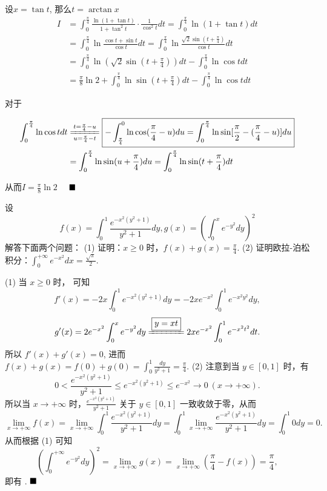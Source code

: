 \documentclass[lang=cn,newtx,10pt,scheme=chinese]{elegantbook}
\begin{document}
\begin{solution}
设$x=\tan t$, 那么$t=\arctan x$
\begin{align*}
I &= \int_{0}^{\frac{\pi}{4}}\frac{\ln(1+\tan t)}{1+\tan^2 t}\cdot\frac{1}{\cos^2 t}dt = \int_{0}^{\frac{\pi}{4}}\ln(1+\tan t)dt \\
&= \int_{0}^{\frac{\pi}{4}}\ln\frac{\cos t+\sin t}{\cos t}dt = \int_{0}^{\frac{\pi}{4}}\ln\frac{\sqrt{2}\sin(t+\frac{\pi}{4})}{\cos t}dt \\
&= \int_{0}^{\frac{\pi}{4}}\ln(\sqrt{2}\sin(t+\frac{\pi}{4}))dt - \int_{0}^{\frac{\pi}{4}}\ln\cos t dt \\
&= \frac{\pi}{8}\ln 2 + \int_{0}^{\frac{\pi}{4}}\ln\sin(t+\frac{\pi}{4})dt - \int_{0}^{\frac{\pi}{4}}\ln\cos t dt
\end{align*}

对于



\begin{align*}
    \int_{0}^{\frac{\pi}{4}}\ln\cos t dt &\xlongequal[u=\frac{\pi}{4}-t]{t=\frac{\pi}{4}-u} \boxed{-\int_{\frac{\pi}{4}}^{0}\ln\cos(\frac{\pi}{4}-u)du = \int_{0}^{\frac{\pi}{4}}\ln\sin[\frac{\pi}{2}-(\frac{\pi}{4}-u)]du}\\
&= \int_{0}^{\frac{\pi}{4}}\ln\sin(u+\frac{\pi}{4})du = \int_{0}^{\frac{\pi}{4}}\ln\sin(t+\frac{\pi}{4})dt
\end{align*}

从而$I=\frac{\pi}{8}\ln 2 \quad  $ $\hfill \blacksquare$
\end{solution}


\begin{example}
设
$$f(x) = \int_{0}^{1} \frac{e^{-x^2(y^2+1)}}{y^2+1} dy, g(x) = \left(\int_{0}^{x} e^{-y^2} dy\right)^2$$
解答下面两个问题：
(1) 证明：$x \ge 0$ 时，$f(x) + g(x) = \frac{\pi}{4}$.
(2) 证明欧拉-泊松积分：$\int_{0}^{+\infty} e^{-x^2} dx = \frac{\sqrt{\pi}}{2}$.
\end{example}

\begin{solution}
(1) 当 $x \ge 0$ 时， 可知
$$f'(x) = -2x \int_{0}^{1} e^{-x^2(y^2+1)} dy = -2xe^{-x^2} \int_{0}^{1} e^{-x^2y^2} dy,$$
$$g'(x) = 2e^{-x^2} \int_{0}^{x} e^{-y^2} dy \xlongequal{\boxed{y=xt}} 2xe^{-x^2} \int_{0}^{1} e^{-x^2t^2} dt.$$
所以 $f'(x) + g'(x) = 0$, 进而 $f(x)+g(x) = f(0)+g(0) = \int_{0}^{1} \frac{dy}{y^2+1} = \frac{\pi}{4}$.
(2) 注意到当 $y \in [0, 1]$ 时，有
$$0 < \frac{e^{-x^2(y^2+1)}}{y^2+1} \le e^{-x^2(y^2+1)} \le e^{-x^2} \to 0~(x \to +\infty).$$
所以当 $x \to +\infty$ 时，$\frac{e^{-x^2(y^2+1)}}{y^2+1}$ 关于 $y \in [0, 1]$ 一致收敛于零，从而
$$\lim\limits_{x \to +\infty} f(x) = \lim\limits_{x \to +\infty} \int_{0}^{1} \frac{e^{-x^2(y^2+1)}}{y^2+1} dy = \int_{0}^{1} \lim\limits_{x \to +\infty} \frac{e^{-x^2(y^2+1)}}{y^2+1} dy = \int_{0}^{1} 0 dy = 0.$$
从而根据 (1) 可知
$$\left(\int_{0}^{+\infty} e^{-y^2} dy\right)^2 = \lim\limits_{x \to +\infty} g(x) = \lim\limits_{x \to +\infty} \left(\frac{\pi}{4} - f(x)\right) = \frac{\pi}{4},$$
即有 
.
$\hfill \blacksquare$
\end{solution}
\end{document}
